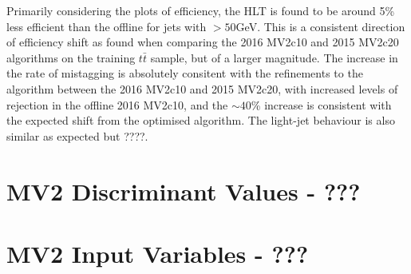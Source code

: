 		Primarily considering the \pt plots of efficiency, the HLT \btag is found to be around 5\% less efficient than the offline \btag for jets with \pt$>50$GeV. This is a consistent direction of efficiency shift as found when comparing the 2016 MV2c10 and 2015 MV2c20 algorithms on the training $t\bar{t}$ sample, but of a larger magnitude. The increase in the rate of \cjet mistagging is absolutely consitent with the refinements to the algorithm between the 2016 MV2c10 and 2015 MV2c20, with increased levels of \cjet rejection in the offline 2016 MV2c10, and the $\sim40$\% increase is consistent with the expected shift from the optimised algorithm. \cite{btagOptimisation} The light-jet behaviour is also similar as expected but ????. 


	\section{MV2 Discriminant Values - ???} 


	\section{MV2 Input Variables - ???}


\endinput
